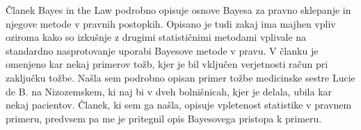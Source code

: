 \documentclass[a4paper,12pt]{article}
\begin{document}
Članek Bayes in the Law podrobno opisuje osnove Bayesa za pravno sklepanje in njegove metode v pravnih postopkih. 
Opisano je tudi zakaj ima majhen vpliv oziroma kako so izkušnje z drugimi statističnimi metodami vplivale na standardno 
nasprotovanje uporabi Bayesove metode v pravu. V članku je omenjeno kar nekaj primerov tožb, kjer je bil vključen verjetnosti račun 
pri zaključku tožbe. Našla sem podrobno opisan primer tožbe medicinske sestre Lucie de B. na Nizozemskem, ki naj bi v dveh bolnišnicah, 
kjer je delala, ubila kar nekaj pacientov. Članek, ki sem ga našla, opisuje vpletenost statistike v pravnem primeru, predvsem pa me je pritegnil
opis Bayesovega pristopa k primeru.
\end{document}
